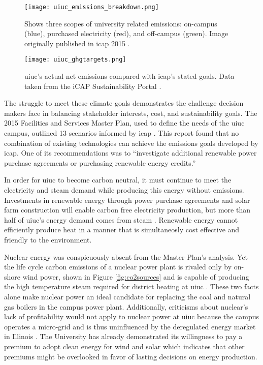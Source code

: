 \begin{figure}[h]
  \centering
  \texttt{[image: uiuc\_emissions\_breakdown.png]}
  \caption{Shows three scopes of university related emissions: on-campus
  (blue), purchased electricity (red), and off-campus (green). Image originally
  published in \gls{icap} 2015 \cite{isee_illinois_2015}.}
  \label{fig:uiuc_emissions_breakdown}
\end{figure}

\begin{figure}[h]
  \centering
  \texttt{[image: uiuc\_ghgtargets.png]}
  \caption{\gls{uiuc}'s actual net emissions compared with \gls{icap}'s
  stated goals. Data taken from the iCAP Sustainability Portal
  \cite{noauthor_metric_nodate}.}
  \label{fig:uiuc_ghg}
\end{figure}

The struggle to meet these climate goals demonstrates the challenge decision
makers face in balancing stakeholder interests, cost, and sustainability goals.
The 2015 Facilities and Services Master Plan, used to define the needs of the
\gls{uiuc} campus, outlined 13 scenarios informed by \gls{icap}
\cite{affiliated_engineers_inc_utilities_2015}. This report found that no
combination of existing technologies can achieve the emissions goals developed
by \gls{icap}. One of its recommendations was to ``investigate additional
renewable power purchase agreements or purchasing renewable energy credits.''

In order for \gls{uiuc} to become carbon neutral, it must continue to meet the
electricity and steam demand while producing this energy without emissions.
Investments in renewable energy through power purchase agreements and solar
farm construction will enable carbon free electricity production, but more than
half of \gls{uiuc}'s energy demand comes from steam \cite{isee_illinois_2015}
. Renewable energy cannot
efficiently produce heat in a manner that is simultaneosly cost effective and
friendly to the environment.

Nuclear energy was conspicuously absent from the Master Plan's analysis. Yet
the life cycle carbon emissions of a nuclear power plant is rivaled only by on-
shore wind power, shown in Figure \ref{fig:co2sources} and is capable of
producing the high temperature steam required for district heating at
\gls{uiuc} \cite{allen_framing_2018}. These two facts alone make nuclear power
an ideal candidate for replacing the coal and natural gas boilers in the campus
power plant. Additionally, criticisms about nuclear's lack of profitability
would not apply to nuclear power at \gls{uiuc} because the campus operates a
micro-grid and is thus uninfluenced by the deregulated energy market in
Illinois \cite{clemmer_nuclear_2018, nian_economic_2020}. The University has
already demonstrated its willingness to pay a premium to adopt clean energy for
wind and solar
\cite{breitweiser_wind_2016,white_solar_2017,noauthor_solar_nodate} which
indicates that other premiums might be overlooked in favor of lasting decisions
on energy production.

